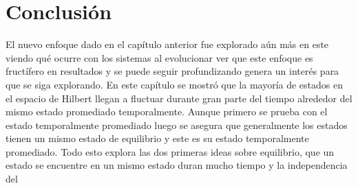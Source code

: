 \section{Conclusión}

El nuevo enfoque dado en el capítulo anterior fue explorado aún más en este viendo qué ocurre con los sistemas al evolucionar ver que este enfoque es fructífero  en resultados y se puede seguir profundizando genera un interés para que se siga explorando. En este capítulo se mostró que la mayoría de estados en el espacio de Hilbert llegan a fluctuar durante gran parte del tiempo alrededor del mismo estado promediado temporalmente. Aunque primero se prueba con el estado temporalmente promediado luego se asegura que generalmente los estados tienen un mismo estado de equilibrio y este es su estado temporalmente promediado. Todo esto explora las dos primeras ideas sobre equilibrio, que un estado se encuentre en un mismo estado duran mucho tiempo y la independencia del 


